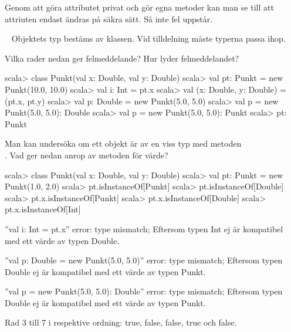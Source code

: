 \SubtaskSolved
Genom att göra attributet privat och gör egna metoder kan man se till att attriuten endast ändras på säkra sätt. Så inte fel uppstår.


\QUESTEND









\QUESTBEGIN

\Task  \what~  Objektets typ bestäms av klassen. Vid tilldelning måste typerna passa ihop.

\Subtask Vilka rader nedan ger felmeddelande? Hur lyder felmeddelandet?
\begin{REPL}
scala> class Punkt(val x: Double, val y: Double)
scala> val pt: Punkt = new Punkt(10.0, 10.0)
scala> val i: Int = pt.x
scala> val (x: Double, y: Double) = (pt.x, pt.y)
scala> val p: Double = new Punkt(5.0, 5.0)
scala> val p = new Punkt(5.0, 5.0): Double
scala> val p = new Punkt(5.0, 5.0): Punkt
scala> pt: Punkt
\end{REPL}


\Subtask Man kan undersöka om ett objekt är av en viss typ med metoden \\ . Vad ger nedan anrop av metoden  för värde?
\begin{REPL}
scala> class Punkt(val x: Double, val y: Double)
scala> val pt: Punkt = new Punkt(1.0, 2.0)
scala> pt.isInstanceOf[Punkt]
scala> pt.isInstanceOf[Double]
scala> pt.x.isInstanceOf[Punkt]
scala> pt.x.isInstanceOf[Double]
scala> pt.x.isInstanceOf[Int]
\end{REPL}

\SOLUTION


\TaskSolved \what


\SubtaskSolved
''val i: Int = pt.x'' error: type mismatch;
Eftersom typen Int ej är kompatibel med ett värde av typen Double.

''val p: Double = new Punkt(5.0, 5.0)'' error: type mismatch;
Eftersom typen Double ej är kompatibel med ett värde av typen Punkt.

''val p = new Punkt(5.0, 5.0): Double'' error: type mismatch;
Eftersom typen Double ej är kompatibel med ett värde av typen Punkt.

\SubtaskSolved
Rad 3 till 7 i respektive ordning: true, false, false, true och false.


\QUESTEND




